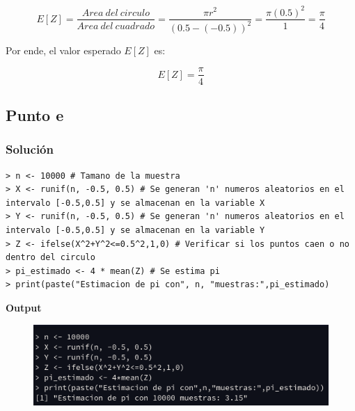 \documentclass[12pt]{article}
\begin{document}
\[E[Z] = \frac{Area\ del\ circulo}{Area\ del\ cuadrado} = \frac{\pi r^2}{(0.5-(-0.5))^2}=\frac{\pi(0.5)^2}{1}=\frac{\pi}{4}\]


Por ende, el valor esperado $E[Z]$ es:

\[E[Z]=\frac{\pi}{4}\]



\subsection{Punto e}
\subsubsection{Solución}

\begin{lstlisting}
> n <- 10000 # Tamano de la muestra
> X <- runif(n, -0.5, 0.5) # Se generan 'n' numeros aleatorios en el intervalo [-0.5,0.5] y se almacenan en la variable X
> Y <- runif(n, -0.5, 0.5) # Se generan 'n' numeros aleatorios en el intervalo [-0.5,0.5] y se almacenan en la variable Y
> Z <- ifelse(X^2+Y^2<=0.5^2,1,0) # Verificar si los puntos caen o no dentro del circulo
> pi_estimado <- 4 * mean(Z) # Se estima pi
> print(paste("Estimacion de pi con", n, "muestras:",pi_estimado)
\end{lstlisting}

\textbf{Output}

\begin{figure}[h]
    \centering
    \includegraphics[scale=0.5]{img/output-7.png}
\end{figure}
\end{document}
